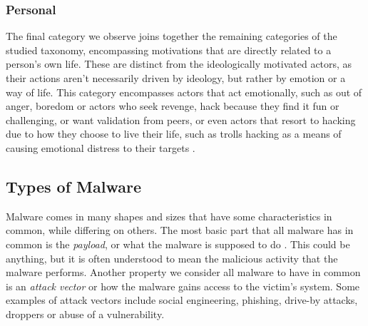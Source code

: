 \subsubsection{Personal}
The final category we observe joins together the remaining categories of the studied taxonomy, encompassing motivations
that are directly related to a person's own life. These are distinct from the ideologically motivated actors, as their
actions aren't necessarily driven by ideology, but rather by emotion or a way of life. This category encompasses actors
that act emotionally, such as out of anger, boredom or actors who seek revenge, hack because they find it fun or
challenging, or want validation from peers, or even actors that resort to hacking due to how they choose to live their
life, such as trolls hacking as a means of causing emotional distress to their targets
\cite{malware-motivation-classification, brewster-malware-motivation}.

\subsection{Types of Malware}
Malware comes in many shapes and sizes that have some characteristics in common, while differing on others. The most
basic part that all malware has in common is the \emph{payload}, or what the malware is supposed to do 
\cite[p.~12]{aycock-book}. This could be anything, but it is often understood to mean the malicious activity that 
the malware performs. Another property we consider all malware to have in common is an \emph{attack vector} or how
the malware gains access to the victim's system. Some examples of attack vectors include
social engineering, phishing, drive-by attacks, droppers or abuse of a vulnerability.

